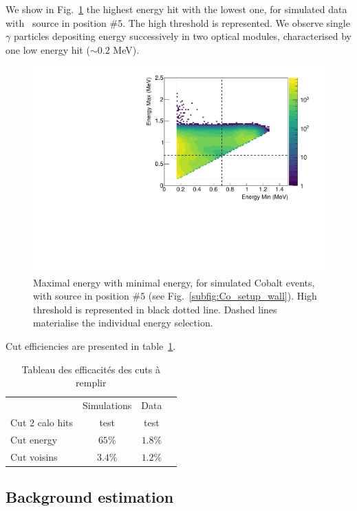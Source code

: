 We show in Fig.~\ref{fig:Co_energy_cut} the highest energy hit with the lowest one, for simulated data with \Co\ source in position $\#5$.
The high threshold is represented.
We observe single $\gamma$ particles depositing energy successively in two optical modules, characterised by one low energy hit ($\sim 0.2$ MeV).
\begin{figure}[h]
  \centering
  \includegraphics[width=14cm]{commissioning/fig_commissioning/Co_energy_cut.pdf}
  \caption{Maximal energy with minimal energy, for simulated Cobalt events, with source in position $\#5$ (see Fig.~\ref{subfig:Co_setup_wall}).
    High threshold is represented in black dotted line.
    Dashed lines materialise the individual energy selection.
    \label{fig:Co_energy_cut}}
\end{figure}

Cut efficiencies are presented in table~\ref{tab:Co_cut_eff}.
\begin{table}[h]
  \centering

  \begin{tabular}{ l c c c }
    & Simulations & Data \\
    Cut $2$ calo hits & test & test \\
    Cut energy & $65$\% & $1.8$\% \\
    Cut voisins & $3.4$\% & $1.2$\% \\
  \end{tabular}
  \caption{Tableau des efficacités des cuts à remplir
    \label{tab:Co_cut_eff}}
\end{table}



\subsection{Background estimation}
\label{subsec:bkg_estimation}


